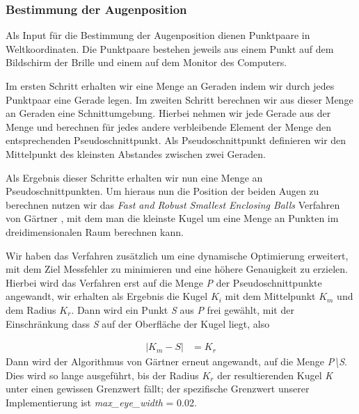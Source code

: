 \subsubsection{Bestimmung der Augenposition}
\label{sec:Augenposition}
Als Input für die Bestimmung der Augenposition dienen Punktpaare in Weltkoordinaten. Die Punktpaare bestehen jeweils aus einem Punkt auf dem Bildschirm der Brille und einem auf dem Monitor des Computers.

Im ersten Schritt erhalten wir eine Menge an Geraden indem wir durch jedes Punktpaar eine Gerade legen. Im zweiten Schritt berechnen wir aus dieser Menge an Geraden eine Schnittumgebung. Hierbei nehmen wir jede Gerade aus der Menge und berechnen für jedes andere verbleibende Element der Menge den entsprechenden Pseudoschnittpunkt. Als Pseudoschnittpunkt definieren wir den      Mittelpunkt des kleinsten Abstandes zwischen zwei Geraden.

Als Ergebnis dieser Schritte erhalten wir nun eine Menge an Pseudoschnittpunkten. Um hieraus nun die Position der beiden Augen zu berechnen nutzen wir das \emph{Fast and Robust Smallest Enclosing Balls} Verfahren von Gärtner \cite{gaertner}, mit dem man die kleinste Kugel um eine Menge an Punkten im dreidimensionalen Raum berechnen kann.

Wir haben das Verfahren zusätzlich um eine dynamische Optimierung erweitert, mit dem Ziel
Messfehler zu minimieren und eine höhere Genauigkeit zu erzielen.\\ 

Hierbei wird das Verfahren erst auf die Menge \emph{P} der Pseudoschnittpunkte angewandt, wir erhalten als Ergebnis die Kugel $K_i$ mit  dem Mittelpunkt $K_m$ und dem Radius $K_r$. Dann wird ein Punkt \emph{S} aus \emph{P} frei gewählt, mit der Einschränkung dass \emph{S} auf der Oberfläche der Kugel liegt, also 

\begin{align}
| K_m - S | &= K_r
\end{align} Dann wird der Algorithmus von Gärtner erneut angewandt, auf die Menge \emph{P\textbackslash S}. Dies wird so lange ausgeführt, bis
der Radius $K_r$ der resultierenden Kugel \emph{K} unter einen gewissen Grenzwert fällt; der spezifische Grenzwert unserer Implementierung ist \emph{max\_eye\_width} = 0.02.

